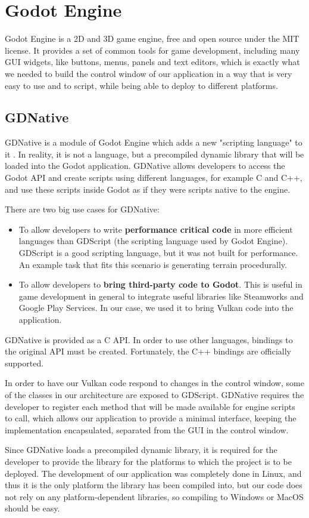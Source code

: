 \section{Godot Engine}
Godot Engine is a 2D and 3D game engine, free and open source under the MIT license. It provides a set of common tools for game development, including many GUI widgets, like buttons, menus, panels and text editors, which is exactly what we needed to build the control window of our application in a way that is very easy to use and to script, while being able to deploy to different platforms.

\subsection{GDNative}
GDNative is a module of Godot Engine which adds a new "scripting language" to it \cite{gdnative_post}. In reality, it is not a language, but a precompiled dynamic library that will be loaded into the Godot application. GDNative allows developers to access the Godot API and create scripts using different languages, for example C and C++,  and use these scripts inside Godot as if they were scripts native to the engine.

There are two big use cases for GDNative:

\begin{itemize}
    \item To allow developers to write \textbf{performance critical code} in more efficient languages than GDScript (the scripting language used by Godot Engine). GDScript is a good scripting language, but it was not built for performance. An example task that fits this scenario is generating terrain procedurally.
    \item To allow developers to \textbf{bring third-party code to Godot}. This is useful in game development in general to integrate useful libraries like Steamworks and Google Play Services. In our case, we used it to bring Vulkan code into the application.
\end{itemize}

GDNative is provided as a C API. In order to use other languages, bindings to the original API must be created. Fortunately, the C++ bindings are officially supported.

In order to have our Vulkan code respond to changes in the control window, some of the classes in our architecture are exposed to GDScript. GDNative requires the developer to register each method that will be made available for engine scripts to call, which allows our application to provide a minimal interface, keeping the implementation encapsulated, separated from the GUI in the control window.

Since GDNative loads a precompiled dynamic library, it is required for the developer to provide the library for the platforms to which the project is to be deployed. The development of our application was completely done in Linux, and thus it is the only platform the library has been compiled into, but our code does not rely on any platform-dependent libraries, so compiling to Windows or MacOS should be easy.
